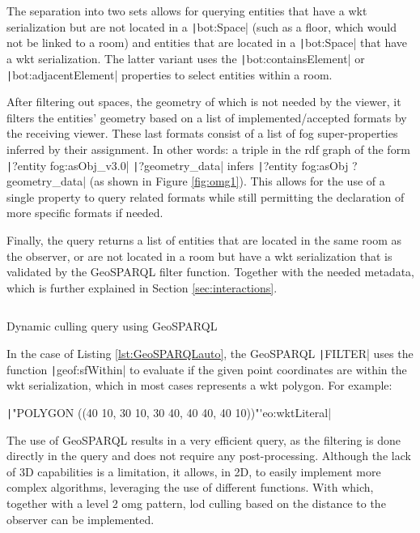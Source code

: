 The separation into two sets allows for querying entities that have a \ac{wkt} serialization but are not located in a \texttt|bot:Space| (such as a floor, which would not be linked to a room) and entities that are located in a \texttt|bot:Space| that have a \ac{wkt} serialization. The latter variant uses the \texttt|bot:containsElement| or \texttt|bot:adjacentElement| properties to select entities within a room.

After filtering out spaces, the geometry of which is not needed by the viewer, it filters the entities' geometry based on a list of implemented/accepted formats by the receiving viewer. These last formats consist of a list of \ac{fog} super-properties inferred by their assignment. In other words: a triple in the \ac{rdf} graph of the form \texttt|?entity fog:asObj_v3.0| \texttt|?geometry_data| infers \texttt|?entity fog:asObj ?geometry_data| (as shown in Figure \ref{fig:omg1}). This allows for the use of a single property to query related formats while still permitting the declaration of more specific formats if needed.

Finally, the query returns a list of entities that are located in the same room as the observer, or are not located in a room but have a \ac{wkt} serialization that is validated by the GeoSPARQL filter function. Together with the needed metadata, which is further explained in Section \ref{sec:interactions}.

\begin{listing}[H]
    \inputminted{sparql}{dynamicQueries/inSitu/query.rq}
    \vspace{-0.7cm}
    \caption{Dynamic culling query using GeoSPARQL}
    \label{lst:GeoSPARQLauto}
\end{listing}

In the case of Listing \ref{lst:GeoSPARQLauto}, the GeoSPARQL \texttt|FILTER| uses the function \texttt|geof:sfWithin| to evaluate if the given point coordinates are within the \ac{wkt} serialization, which in most cases represents a \ac{wkt} polygon. For example:

\texttt|"POLYGON ((40 10, 30 10, 30 40, 40 40, 40 10))"^^geo:wktLiteral|

The use of GeoSPARQL results in a very efficient query, as the filtering is done directly in the query and does not require any post-processing. Although the lack of 3D capabilities is a limitation, it allows, in 2D, to easily implement more complex algorithms, leveraging the use of different functions. With which, together with a level 2 \ac{omg} pattern, \ac{lod} culling based on the distance to the observer can be implemented.

